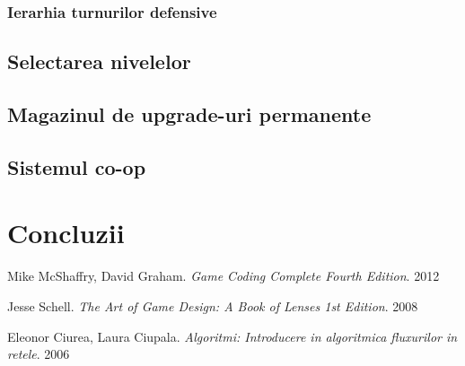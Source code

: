 \documentclass[12pt, a4paper]{article}
\begin{document}
	\subsubsection{Ierarhia turnurilor defensive}
	
	
	\subsection{Selectarea nivelelor}
	
	
	
	\subsection{Magazinul de upgrade-uri permanente}
	
	
	
	\subsection{Sistemul co-op}
	
	
	
	
	\section{Concluzii}
	
	
	\pagebreak
	\begin{thebibliography}{3}
		Mike McShaffry, David Graham. \newline
		\textit{Game Coding Complete Fourth Edition}. 2012
		
		Jesse Schell.  \newline
		\textit{The Art of Game Design: A Book of Lenses 1st Edition}. 2008
		
		Eleonor Ciurea, Laura Ciupala.  \newline
		\textit{Algoritmi: Introducere in algoritmica fluxurilor in retele}. 2006
		
	\end{thebibliography}
	
	
\end{document}
